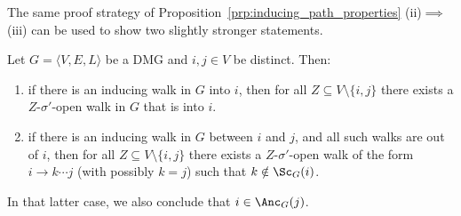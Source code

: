 The same proof strategy of Proposition~\ref{prp:inducing_path_properties} (ii)$\implies$(iii) can be used to show two slightly stronger statements.
\begin{Prp}\label{prp:inducing_path_orientations}
  Let $G = \langle V,E,L \rangle$ be a DMG and $i,j \in V$ be distinct. Then:
  \begin{enumerate}[label=(\roman*)]
    \item if there is an inducing walk in $G$ into $i$, then for all 
      $Z \subseteq V \setminus \{i,j\}$ there exists a $Z$-$\sigma'$-open walk in $G$ that is
      into $i$.
    \item if there is an inducing walk in $G$ between $i$ and $j$, and all such walks are out of $i$,
      then for all $Z \subseteq V \setminus \{i,j\}$ there exists a $Z$-$\sigma'$-open walk of the form $i \to k \cdots j$
      (with possibly $k = j$) such that $k \notin \Sc_G(i)$.
  \end{enumerate}
  In that latter case, we also conclude that $i \in \Anc_G(j)$.
\end{Prp}
